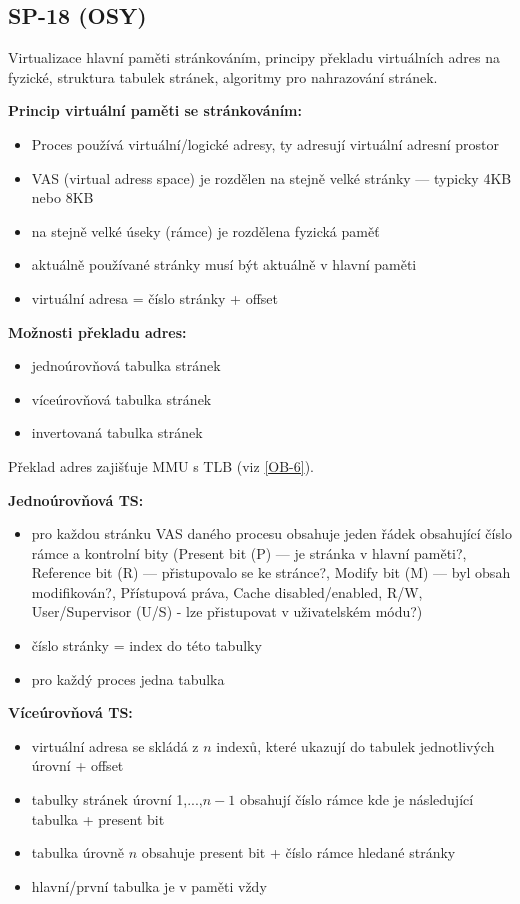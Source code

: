 \subsection{SP-18 (OSY)}
Virtualizace hlavní paměti stránkováním, principy překladu virtuálních adres na fyzické, struktura tabulek stránek, algoritmy pro nahrazování stránek.

\textbf{Princip virtuální paměti se stránkováním:}
\begin{itemize}
	\item Proces používá virtuální/logické adresy, ty adresují virtuální adresní prostor
	\item VAS (virtual adress space) je rozdělen na stejně velké stránky --- typicky 4KB nebo 8KB
	\item na stejně velké úseky (rámce) je rozdělena fyzická paměť
	\item aktuálně používané stránky musí být aktuálně v hlavní paměti 
	\item virtuální adresa = číslo stránky + offset
\end{itemize}

\textbf{Možnosti překladu adres:}
\begin{itemize}
	\item jednoúrovňová tabulka stránek
	\item víceúrovňová tabulka stránek
	\item invertovaná tabulka stránek
\end{itemize}

Překlad adres zajišťuje MMU s TLB (viz \ref{OB-6}).

\textbf{Jednoúrovňová TS:}
\begin{itemize}
	\item pro každou stránku VAS daného procesu obsahuje jeden řádek obsahující číslo rámce a kontrolní bity (Present bit (P) --- je stránka v hlavní paměti?, Reference bit (R) --- přistupovalo se ke stránce?, Modify bit (M) --- byl obsah modifikován?, Přístupová práva, Cache disabled/enabled, R/W, User/Supervisor (U/S) - lze přistupovat v uživatelském módu?)
	\item číslo stránky = index do této tabulky
	\item pro každý proces jedna tabulka
\end{itemize}

\textbf{Víceúrovňová TS:}
\begin{itemize}
	\item virtuální adresa se skládá z $n$ indexů, které ukazují do tabulek jednotlivých úrovní + offset
	\item tabulky stránek úrovní 1,...,$n-1$ obsahují číslo rámce kde je následující tabulka + present bit
	\item tabulka úrovně $n$ obsahuje present bit + číslo rámce hledané stránky
	\item hlavní/první tabulka je v paměti vždy
\end{itemize}

